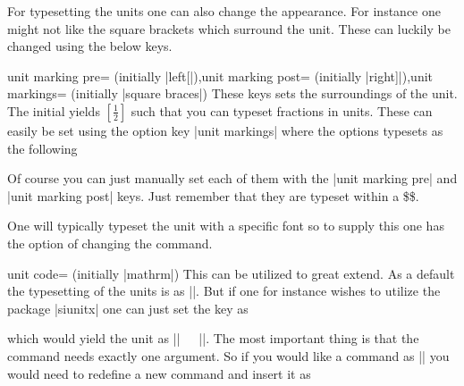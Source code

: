 For typesetting the units one can also change the appearance. For instance one might not like the square brackets which surround the unit. These can
luckily be changed using the below keys.
\begin{pgfplotskeylist}{unit marking pre= (initially |left[|),unit marking post= (initially |right]|),unit markings= (initially |square braces|)}
  These keys sets the surroundings of the unit. The initial yields $\left[\frac{1}{2}\right]$ such that you can typeset fractions in units. These can
  easily be set using the option key |unit markings| where the options typesets as the following
  \begin{codeexample}
    \pgfplotsset{x unit=T,unit markings=parenthesis} %
    \pgfplotsset{x unit=T,unit markings=square braces} %
    \pgfplotsset{x unit=T,unit markings=slash space} %
  \end{codeexample}
  Of course you can just manually set each of them with the |unit marking pre| and |unit marking post| keys. Just remember that they are typeset within a \$\$.
\end{pgfplotskeylist}

One will typically typeset the unit with a specific font so to supply this one has the option of changing the command.
\begin{pgfplotskey}{unit code= (initially |mathrm|)}
  This can be utilized to great extend. As a default the typesetting of the units is as ||. But if one for instance
  wishes to utilize the package |siunitx| one can just set the key as
  \begin{codeexample}
    \pgfplotsset{unit code=\si}
  \end{codeexample}
  which would yield the unit as |\si{||}|. The most important thing is that the command needs exactly one argument. So if you
  would like a command as || you would need to redefine a new command and insert it as
  \begin{codeexample}
    \newcommand\mathrmbf{1}{}
    \pgfplotsset{unit code=\mathrmbf}
  \end{codeexample}
\end{pgfplotskey}


